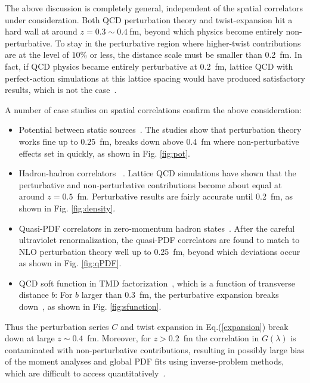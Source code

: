 \documentclass[prd,aps,twocolumn,preprintnumbers,showpacs,nofootinbib,superscriptaddress,notitlepage]{revtex4-2}
\begin{document}
The above discussion is completely general, independent of the spatial correlators under consideration. Both QCD perturbation theory and twist-expansion hit a hard wall at around $z=0.3\sim 0.4~$fm, beyond which physics become entirely non-perturbative. To stay in the perturbative region where higher-twist contributions are at the level of $10\%$ or less, the distance scale must be smaller than 0.2~fm. In fact, if QCD physics became entirely perturbative at $0.2$~fm, lattice QCD with perfect-action simulations at this lattice spacing would have produced satisfactory results, which is not the case~\cite{DeGrand:1994zr}. 

A number of case studies on spatial correlations confirm the above consideration:
\begin{itemize}
    \item Potential between static sources~\cite{Pineda:2002se,Bazavov:2014soa,Ayala:2020odx}. The studies show that perturbation theory works fine up to $0.25$~fm, breaks down above $0.4$~fm where non-perturbative effects set in quickly, as shown in Fig. \ref{fig:pot}.
    
    \item Hadron-hadron correlators ~\cite{Chu:1993cn}. Lattice QCD simulations have shown that the
perturbative and non-perturbative contributions become about equal at around $z=0.5$~fm. Perturbative results
are fairly accurate until 0.2~fm, as shown in Fig. \ref{fig:density}. 

\item Quasi-PDF correlators in zero-momentum hadron states~\cite{LatticePartonCollaborationLPC:2021xdx}. After
the careful ultraviolet renormalization, the quasi-PDF correlators are found to match to NLO perturbation theory well up to 0.25~fm, beyond which deviations occur as shown in Fig. \ref{fig:qPDF}. 

    \item QCD soft function in TMD factorization~\cite{Collins:1981va}, which is a function of transverse distance $b$: For $b$ larger than $0.3$~fm, the perturbative expansion breaks down~\cite{LatticeParton:2020uhz}, as shown in Fig. \ref{fig:sfunction}. 
\end{itemize}

Thus the perturbation series $C$ and twist expansion in Eq.(\ref{expansion}) break down at large $z\sim 0.4$~fm.  Moreover, for $z>0.2$~fm the correlation in $G(\lambda)$ is contaminated with non-perturbative contributions, resulting in possibly large bias of the moment analyses and global PDF fits using inverse-problem methods, which are difficult to access quantitatively~\cite{Gao:2020ito,Joo:2020spy,Karpie:2021pap}. 
\end{document}

